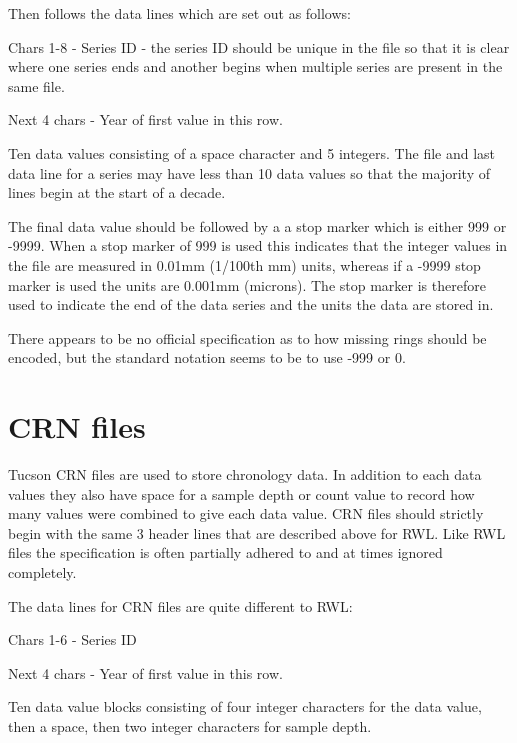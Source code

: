 \documentclass[10pt, headsepline,DIV14,BCOR0.5cm]{scrreprt}
\begin{document}
Then follows the data lines which are set out as follows:

\begin{itemize*}
    \item  Chars 1-8 - Series ID - the series ID should be unique in the file so that it is clear where one series ends and another begins when multiple series are present in the same file.
    \item  Next 4 chars - Year of first value in this row.
    \item  Ten data values consisting of a space character and 5 integers. The file and last data line for a series may have less than 10 data values so that the majority of lines begin at the start of a decade.  
\end{itemize*}

The final data value should be followed by a a stop marker which is either 999 or -9999. When a stop marker of 999 is used this indicates that the integer values in the file are measured in 0.01mm (1/100th mm) units, whereas if a -9999 stop marker is used the units are 0.001mm (microns). The stop marker is therefore used to indicate the end of the data series and the units the data are stored in.

There appears to be no official specification as to how missing rings should be encoded, but the standard notation seems to be to use -999 or 0. 

\section{CRN files}

Tucson CRN files are used to store chronology data. In addition to each data values they also have space for a sample depth or count value to record how many values were combined to give each data value. CRN files should strictly begin with the same 3 header lines that are described above for RWL. Like RWL files the specification is often partially adhered to and at times ignored completely.

The data lines for CRN files are quite different to RWL:

\begin{itemize*}
    \item  Chars 1-6 - Series ID
    \item  Next 4 chars - Year of first value in this row.
    \item  Ten data value blocks consisting of four integer characters for the data value, then a space, then two integer characters for sample depth. 
\end{itemize*}
\end{document}
